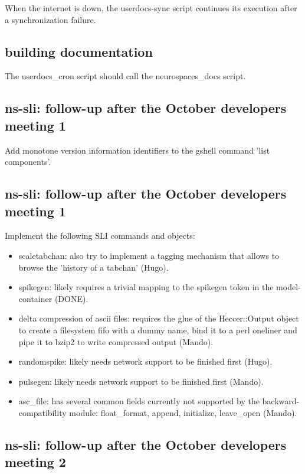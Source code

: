 \documentclass[12pt]{article}
\begin{document}
When the internet is down, the userdocs-sync script continues its
execution after a synchronization failure.


\subsection{building documentation}

The userdocs\_cron script should call the neurospaces\_docs script.


\subsection{ns-sli: follow-up after the October developers meeting 1}

Add monotone version information identifiers to the gshell command
'list components'.


\subsection{ns-sli: follow-up after the October developers meeting 1}

Implement the following SLI commands and objects:

\begin{itemize}
\item scaletabchan: also try to implement a tagging mechanism that
  allows to browse the 'history of a tabchan' (Hugo).
\item spikegen: likely requires a trivial mapping to the spikegen
  token in the model-container (DONE).
\item delta compression of ascii files: requires the glue of the
  Heccer::Output object to create a filesystem fifo with a dummy name,
  bind it to a perl oneliner and pipe it to bzip2 to write compressed
  output (Mando).
\item randomspike: likely needs network support to be finished first
  (Hugo).
\item pulsegen: likely needs network support to be finished first
  (Mando).
\item asc\_file: has several common fields currently not supported by
  the backward-compatibility module: float\_format, append, initialize,
  leave\_open (Mando).
\end{itemize}

\subsection{ns-sli: follow-up after the October developers meeting 2}
\end{document}
